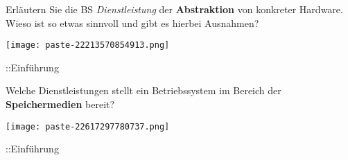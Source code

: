 \documentclass{article}
\begin{document}
\begin{tcolorbox}[colback=white!10!white,colframe=lightgray!75!black,
  savelowerto=\jobname_ex.tex]

\begin{center}
Erläutern Sie die BS
\textit{Dienstleistung
}der 
\textbf{Abstraktion
}von konkreter Hardware. Wieso ist so etwas sinnvoll und gibt es hierbei Ausnahmen?

\end{center}

\tcblower

\justifying
\texttt{[image: paste-22213570854913.png]}

\end{tcolorbox}
\begin{tcolorbox}[colback=white!10!white,colframe=lightgray!75!black,
  savelowerto=\jobname_ex.tex]

\begin{center}
::Einführung

\end{center}

\tcblower

\justifying

\end{tcolorbox}
\begin{tcolorbox}[colback=white!10!white,colframe=lightgray!75!black,
  savelowerto=\jobname_ex.tex]

\begin{center}
Welche Dienstleistungen stellt ein Betriebssystem im Bereich der 
\textbf{Speichermedien
} bereit?

\end{center}

\tcblower

\justifying
\texttt{[image: paste-22617297780737.png]}

\end{tcolorbox}
\begin{tcolorbox}[colback=white!10!white,colframe=lightgray!75!black,
  savelowerto=\jobname_ex.tex]

\begin{center}
::Einführung

\end{center}

\tcblower

\justifying

\end{tcolorbox}
\end{document}
